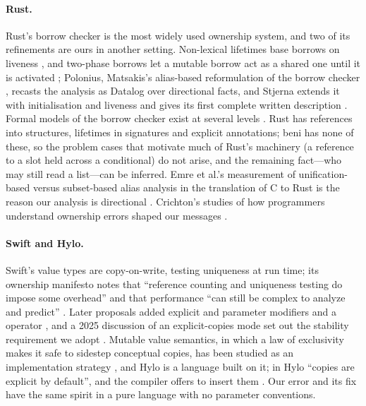 \paragraph{Rust.} Rust's borrow checker is the most widely used ownership system, and two of its refinements
are ours in another setting. Non-lexical lifetimes base borrows on liveness \citep{rfc2094}, and two-phase
borrows let a mutable borrow act as a shared one until it is activated \citep{rfc2025}; Polonius,
Matsakis's alias-based reformulation of the borrow checker \citep{matsakis2018alias}, recasts the analysis
as Datalog over directional facts, and Stjerna extends it with initialisation and liveness and gives its
first complete written description \citep{stjerna2020polonius}. Formal models of the borrow
checker exist at several levels \citep{weiss2019oxide,pearce2021lightweight}. Rust has references into
structures, lifetimes in signatures and explicit annotations; beni has none of these, so the problem cases
that motivate much of Rust's machinery (a reference to a slot held across a conditional) do not arise, and
the remaining fact---who may still read a list---can be inferred. Emre et al.'s measurement of
unification-based versus subset-based alias analysis in the translation of C to Rust is the reason our
analysis is directional \citep{emre2023aliasing}. Crichton's studies of how programmers understand ownership
errors shaped our messages \citep{crichton2020usability,crichton2023grounded,crichton2024profiling}.

\paragraph{Swift and Hylo.} Swift's value types are copy-on-write, testing uniqueness at run time; its
ownership manifesto notes that ``reference counting and uniqueness testing do impose some overhead'' and
that performance ``can still be complex to analyze and predict'' \citep{mccall2017manifesto}. Later
proposals added explicit  and  parameter modifiers and a 
operator \citep{swift2022se0377,swift2022se0366}, and a 2025 discussion of an explicit-copies mode set out
the stability requirement we adopt \citep{swift2025explicitcopies}. Mutable value semantics, in which a law of exclusivity makes it safe to sidestep conceptual copies, has been
studied as an implementation strategy \citep{racordon2022mvs}, and Hylo is a language built on it; in Hylo ``copies are explicit by
default'', and the compiler offers to insert them \citep{hylo2024bindings}. Our error and its 
fix have the same spirit in a pure language with no parameter conventions.

